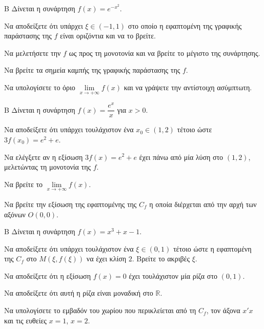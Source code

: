 \begin{thema}{Β}
Δίνεται η συνάρτηση $f(x) = e^{-x^2}$.
\begin{erwthma}
\item Να αποδείξετε ότι υπάρχει $\xi \in (-1, 1)$ στο οποίο η εφαπτομένη της γραφικής παράστασης της $f$ είναι οριζόντια και να το βρείτε.
\item Να μελετήσετε την $f$ ως προς τη μονοτονία και να βρείτε το μέγιστο της συνάρτησης.
\item Να βρείτε τα σημεία καμπής της γραφικής παράστασης της $f$.
\item Να υπολογίσετε το όριο $\lim\limits_{x \to +\infty} f(x)$ και να γράψετε την αντίστοιχη ασύμπτωτη.
\end{erwthma}
\end{thema}

\begin{thema}{Β}
Δίνεται η συνάρτηση $f(x) = \dfrac{e^x}{x}$ για $x > 0$.
\begin{erwthma}
\item Να αποδείξετε ότι υπάρχει τουλάχιστον ένα $x_0 \in (1, 2)$ τέτοιο ώστε $3f(x_0) = e^2+e$.
\item Να ελέγξετε αν η εξίσωση $3f(x) = e^2+e$ έχει πάνω από μία λύση στο $(1, 2)$, μελετώντας τη μονοτονία της $f$.
\item Να βρείτε το $\lim\limits_{x \to +\infty} f(x)$.
\item Να βρείτε την εξίσωση της εφαπτομένης της $C_f$ η οποία διέρχεται από την αρχή των αξόνων $O(0,0)$.
\end{erwthma}
\end{thema}

\begin{thema}{Β}
Δίνεται η συνάρτηση $f(x) = x^3 + x - 1$.
\begin{erwthma}
\item Να αποδείξετε ότι υπάρχει τουλάχιστον ένα $\xi \in (0, 1)$ τέτοιο ώστε η εφαπτομένη της $C_f$ στο $M(\xi, f(\xi))$ να έχει κλίση $2$. Βρείτε το ακριβές $\xi$.
\item Να αποδείξετε ότι η εξίσωση $f(x) = 0$ έχει τουλάχιστον μία ρίζα στο $(0, 1)$.
\item Να αποδείξετε ότι αυτή η ρίζα είναι μοναδική στο $\mathbb{R}$.
\item Να υπολογίσετε το εμβαδόν του χωρίου που περικλείεται από τη $C_f$, τον άξονα $x'x$ και τις ευθείες $x=1$, $x=2$.
\end{erwthma}
\end{thema}


